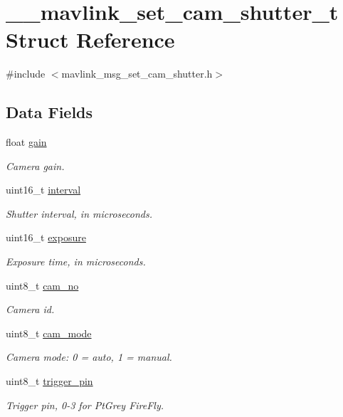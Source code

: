 \hypertarget{struct____mavlink__set__cam__shutter__t}{\section{\+\_\+\+\_\+mavlink\+\_\+set\+\_\+cam\+\_\+shutter\+\_\+t Struct Reference}
\label{struct____mavlink__set__cam__shutter__t}
}


{\ttfamily \#include $<$mavlink\+\_\+msg\+\_\+set\+\_\+cam\+\_\+shutter.\+h$>$}

\subsection*{Data Fields}
\begin{DoxyCompactItemize}
\item 
float \hyperlink{struct____mavlink__set__cam__shutter__t_ab5364d724faec2e008e7938331492f81}{gain}
\begin{DoxyCompactList}\small\item\em Camera gain. \end{DoxyCompactList}\item 
uint16\+\_\+t \hyperlink{struct____mavlink__set__cam__shutter__t_a47229d8a46bcfdeebee87c6c8a7ecea7}{interval}
\begin{DoxyCompactList}\small\item\em Shutter interval, in microseconds. \end{DoxyCompactList}\item 
uint16\+\_\+t \hyperlink{struct____mavlink__set__cam__shutter__t_a4ecf3ff0aad7f0c89d530f2b2696a794}{exposure}
\begin{DoxyCompactList}\small\item\em Exposure time, in microseconds. \end{DoxyCompactList}\item 
uint8\+\_\+t \hyperlink{struct____mavlink__set__cam__shutter__t_af430e052f2ead8b2806e594499b4b2f3}{cam\+\_\+no}
\begin{DoxyCompactList}\small\item\em Camera id. \end{DoxyCompactList}\item 
uint8\+\_\+t \hyperlink{struct____mavlink__set__cam__shutter__t_adc20f1591bc8ccbfb82572baef0c4b8e}{cam\+\_\+mode}
\begin{DoxyCompactList}\small\item\em Camera mode\+: 0 = auto, 1 = manual. \end{DoxyCompactList}\item 
uint8\+\_\+t \hyperlink{struct____mavlink__set__cam__shutter__t_a126d28c52fce8dc369623e23b7b1da82}{trigger\+\_\+pin}
\begin{DoxyCompactList}\small\item\em Trigger pin, 0-\/3 for Pt\+Grey Fire\+Fly. \end{DoxyCompactList}\end{DoxyCompactItemize}


